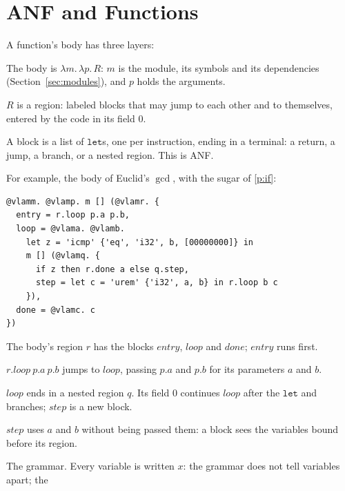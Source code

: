 \documentclass[11pt,letterpaper]{article}
\newcommand{\lam}[2]{\lambda #1.\,#2}       %
\newcommand{\kw}[1]{\mathtt{#1}}
\newcommand{\pref}[1]{\ref{#1}}  %
\begin{document}

\section{ANF and Functions}\label{sec:banf}

\begin{points}
\item\label{p:definition} A function's body has three layers:
  \begin{subpoints}
  \item The body is $\lam{m}{\lam{p}{R}}$: $m$ is the module, its symbols and its dependencies (Section~\ref{sec:modules}),
    and $p$ holds the arguments.
  \item $R$ is a region: labeled blocks that may jump to each other and to themselves, entered by the code in
    its field $0$.
  \item A block is a list of $\kw{let}$s, one per instruction, ending in a terminal: a return, a jump, a branch, or a
    nested region. This is ANF.
  \end{subpoints}
\item\label{p:gcd-body} For example, the body of Euclid's $\gcd$, with the sugar of \pref{p:if}:
  \begin{Verbatim}[commandchars=\@\<\>, xleftmargin=2em]
@vlamm. @vlamp. m [] (@vlamr. {
  entry = r.loop p.a p.b,
  loop = @vlama. @vlamb.
    let z = 'icmp' {'eq', 'i32', b, [00000000]} in
    m [] (@vlamq. {
      if z then r.done a else q.step,
      step = let c = 'urem' {'i32', a, b} in r.loop b c
    }),
  done = @vlamc. c
})
\end{Verbatim}
  \begin{subpoints}
  \item The body's region $r$ has the blocks $\mathit{entry}$, $\mathit{loop}$ and $\mathit{done}$; $\mathit{entry}$ runs first.
  \item $r.\mathit{loop}\ p.a\ p.b$ jumps to $\mathit{loop}$, passing $p.a$ and $p.b$ for its parameters $a$ and $b$.
  \item $\mathit{loop}$ ends in a nested region $q$. Its field $0$ continues $\mathit{loop}$ after the $\kw{let}$ and branches; $\mathit{step}$ is a
    new block.
  \item $\mathit{step}$ uses $a$ and $b$ without being passed them: a block sees the variables bound before its region.
  \end{subpoints}
\item\label{p:anf} The grammar. Every variable is written $x$: the grammar does not tell variables apart; the

\end{points}
\end{document}
